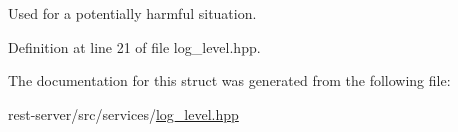 Used for a potentially harmful situation. 



Definition at line 21 of file log\+\_\+level.\+hpp.



The documentation for this struct was generated from the following file\+:\begin{DoxyCompactItemize}
\item 
rest-\/server/src/services/\mbox{\hyperlink{log__level_8hpp}{log\+\_\+level.\+hpp}}\end{DoxyCompactItemize}
